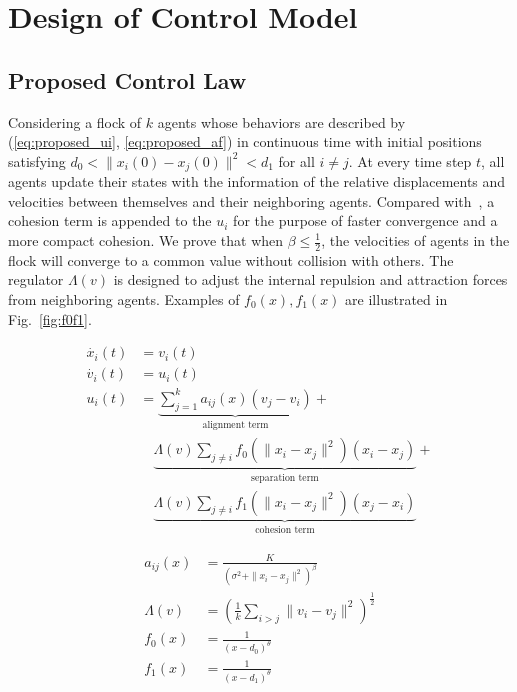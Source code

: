 \chapter{Design of Control Model}\label{design}

\section{Proposed Control Law}\label{control_law}

Considering a flock of $k$ agents whose behaviors are described by (\ref{eq:proposed_ui}, \ref{eq:proposed_af}) in continuous time with initial positions satisfying $d_0<\|x_i(0)-x_j(0)\|^2<d_1$ for all $i\neq j$. At every time step $t$, all agents update their states with the information of the relative displacements and velocities between themselves and their neighboring agents. Compared with~\cite{CuckerDong2010}, a cohesion term is appended to the $u_i$ for the purpose of faster convergence and a more compact cohesion. We prove that when $\beta\leq\frac{1}{2}$, the velocities of agents in the flock will converge to a common value without collision with others. The regulator $\Lambda(v)$ is designed to adjust the internal repulsion and attraction forces from neighboring agents. Examples of $f_0(x), f_1(x)$ are illustrated in Fig.~\ref{fig:f0f1}.

\begin{equation}\label{eq:proposed_ui}
\begin{aligned}
\dot{x_i}(t)&=v_i(t)\\
\dot{v_i}(t)&=u_i(t)\\
u_i(t)&=\underbrace{\sum^k_{j=1}a_{ij}(x)(v_j-v_i)}_{\text{alignment term}}+\\
&\quad\underbrace{\Lambda(v)\sum_{j\neq i}f_0(\|x_i-x_j\|^2)(x_i-x_j)}_{\text{separation term}}+\\
&\quad\underbrace{\Lambda(v)\sum_{j\neq i}f_1(\|x_i-x_j\|^2)(x_j-x_i)}_{\text{cohesion term}}
\end{aligned}
\end{equation}

\begin{equation}\label{eq:proposed_af}
\begin{aligned}
a_{ij}(x)&=\frac{K}{(\sigma^2+\|x_i-x_j\|^2)^{\beta}}\\
\Lambda(v)&=(\frac{1}{k}\sum_{i>j}\|v_i-v_j\|^2)^{\frac{1}{2}}\\
f_0(x)&=\frac{1}{(x-d_0)^{\theta}}\\
f_1(x)&=\frac{1}{(x-d_1)^{\theta}}
\end{aligned}
\end{equation}

